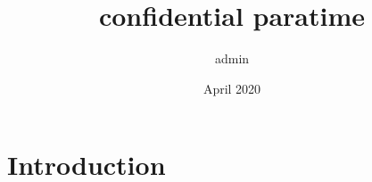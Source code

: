 \documentclass{article}
\title{confidential paratime}
\author{admin }
\date{April 2020}
\begin{document}
\maketitle

\section{Introduction}
\end{document}
